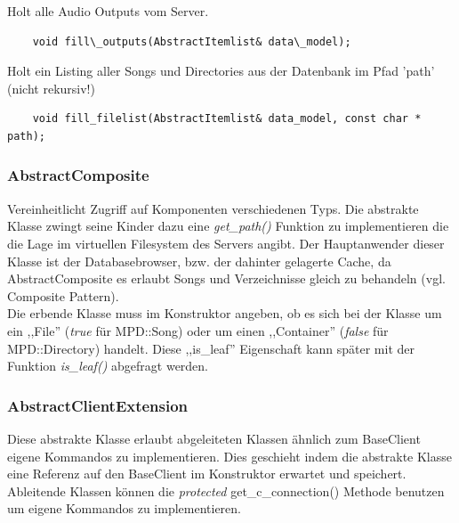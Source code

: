 Holt alle Audio Outputs vom Server.
\begin{verbatim}
    void fill\_outputs(AbstractItemlist& data\_model);
\end{verbatim}

Holt ein Listing aller Songs und Directories aus der Datenbank im Pfad 'path' (nicht rekursiv!)              
\begin{verbatim}
    void fill_filelist(AbstractItemlist& data_model, const char * path);
\end{verbatim}



\subsubsection{AbstractComposite}
Vereinheitlicht Zugriff auf Komponenten verschiedenen Typs.
Die abstrakte Klasse zwingt seine Kinder dazu eine \emph{get\_path()} Funktion zu implementieren die die Lage im virtuellen Filesystem des Servers angibt.
Der Hauptanwender dieser Klasse ist der Databasebrowser, bzw. der dahinter gelagerte Cache, da AbstractComposite es erlaubt Songs und Verzeichnisse gleich zu behandeln (vgl. Composite Pattern).
\\
Die erbende Klasse muss im Konstruktor angeben, ob es sich bei der Klasse um ein ,,File'' (\emph{true} für MPD::Song) oder um einen ,,Container'' (\emph{false} für MPD::Directory) handelt.
Diese ,,is\_leaf'' Eigenschaft kann später mit der Funktion \emph{is\_leaf()} abgefragt werden.



\subsubsection{AbstractClientExtension}

%
%

Diese abstrakte Klasse erlaubt abgeleiteten Klassen ähnlich zum BaseClient eigene Kommandos zu implementieren.
Dies geschieht indem die abstrakte Klasse eine Referenz auf den BaseClient im Konstruktor erwartet und speichert.
Ableitende Klassen können die \textit{protected} get\_c\_connection() Methode benutzen um eigene Kommandos zu implementieren.

